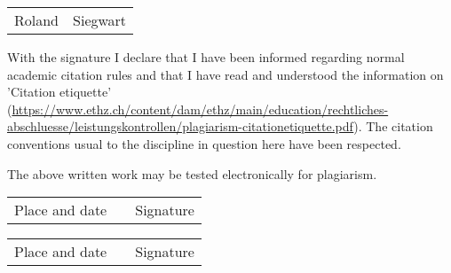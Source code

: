 \begin{tabular}{ p{5cm} p{5cm} }
  Roland & Siegwart \\
\end{tabular}

\vspace{1cm}

With the signature I declare that I have been informed regarding normal academic citation rules and that I have read and understood the information on 'Citation etiquette' (\url{https://www.ethz.ch/content/dam/ethz/main/education/rechtliches-abschluesse/leistungskontrollen/plagiarism-citationetiquette.pdf}). The citation conventions usual to the discipline in question here have been respected.

\vspace{0.5cm}

The above written work may be tested electronically for plagiarism.

\vspace{3cm}

\begin{tabular}{ p{5cm} p{1cm} p{5cm} }
  \cline{1-1} \cline{3-3}
  Place and date & & Signature \\
\end{tabular}

\vspace{1.5cm}

\begin{tabular}{ p{5cm} p{1cm} p{5cm} }
  \cline{1-1} \cline{3-3}
  Place and date & & Signature \\
\end{tabular}
